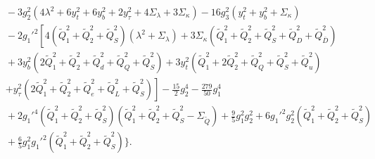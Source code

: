 \documentclass[preprint,amsmath,amssymb,aps,superscriptaddress,prd,showpacs,floatfix,nofootinbib]{revtex4-1}
\begin{document}
\begin{subequations}
\begin{align}
&{}-3g_2^2\left ( 4\lambda^2+6y_t^2+6y_b^2+2y_\tau^2+4\Sigma_\lambda+3\Sigma_\kappa\right )-16g_3^2\left ( y_t^2+y_b^2+\Sigma_\kappa \right )\nonumber\\
&{}-2g_1'^2\left [ 4\left ( \tilde{Q}_1^2+\tilde{Q}_2^2+\tilde{Q}_S^2\right )\left ( \lambda^2 +\Sigma_\lambda \right )+3\Sigma_\kappa\left ( \tilde{Q}_1^2+\tilde{Q}_2^2+\tilde{Q}_S^2+\tilde{Q}_D^2+\tilde{Q}_{\overline{D}}^2\right )\right .\nonumber\\
&{}+3y_b^2\left ( 2\tilde{Q}_1^2+\tilde{Q}_2^2+\tilde{Q}_d^2+\tilde{Q}_Q^2+\tilde{Q}_S^2 \right )+3y_t^2\left ( \tilde{Q}_1^2+2\tilde{Q}_2^2+\tilde{Q}_Q^2+\tilde{Q}_S^2+\tilde{Q}_u^2\right )\nonumber\\
&{}\left.+y_\tau^2\left ( 2\tilde{Q}_1^2+\tilde{Q}_2^2+\tilde{Q}_e^2+\tilde{Q}_L^2+\tilde{Q}_S^2\right )\right ]-\frac{15}{2}g_2^4-\frac{279}{50}g_1^4\nonumber\\
&{}+2g_1'^4\left ( \tilde{Q}_1^2+\tilde{Q}_2^2+\tilde{Q}_S^2 \right )\left (\tilde{Q}_1^2+\tilde{Q}_2^2+\tilde{Q}_S^2-\Sigma_{\tilde{Q}}\right )+\frac{9}{5}g_1^2g_2^2+6g_1'^2g_2^2\left ( \tilde{Q}_1^2+\tilde{Q}_2^2+\tilde{Q}_S^2\right )\nonumber\\
&{}+\frac{6}{5}g_1^2g_1'^2\left ( \tilde{Q}_1^2+\tilde{Q}_2^2+\tilde{Q}_S^2 \right ) \bigg \}.
\end{align}
\end{subequations}

{}
\end{document}
